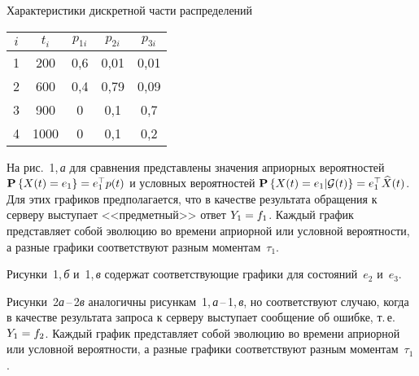 \begin{multicols}{2}
\vspace*{6pt}

\noindent
\begin{center}
{\small{Характеристики дискретной части распределений}}
\end{center}


\noindent
{\small\begin{center}
\tabcolsep=15.5pt
\begin{tabular}{|c|c|c|c|c|}
\hline
$i$ & $t_i$ & $p_{1i}$& $p_{2i}$ & $p_{3i}$ \\
\hline
1 &  200 & 0,6& 0,01& 0,01\\
2 &  600 & 0,4 & 0,79& 0,09\\
3 &  900 & 0\hphantom{,9} & 0,1\hphantom{9}& 0,7\hphantom{9}\\
4  & 1000\hphantom{9} & 0\hphantom{,9} & 0,1\hphantom{9}& 0,2\hphantom{9}\\
\hline
\end{tabular}
\vspace*{3pt}
\end{center}}


На рис.~1,\,\textit{а} для сравнения пред\-став\-лены значения априорных вероятностей
$\pp{X(t)\hm=e_1}\hm=e_1^{\top}p(t)$ и условных вероятностей
$\pp{X(t)\hm=e_1|\G(t)}\hm=e_1^{\top}\widehat{X}(t)$. Для этих графиков
предполагается, что в качестве результата обращения к серверу выступает
<<предметный>> ответ $Y_1\hm=f_1$. Каждый график представляет собой эволюцию
во времени априорной или условной вероятности, а разные графики соответствуют
разным моментам~$\tau_1$.

\addtocounter{table}{1}


Рисунки~1,\,\textit{б}  и~1,\,\textit{в}
содержат соответствующие графики для со\-сто\-яний~$e_2$ и~$e_3$.


Рисунки~2\textit{а}\,--\,2\textit{в}
аналогичны рисункам~1,\,\textit{а}\,--\,1,\,\textit{в},
но соответствуют случаю, когда
в качестве результата запроса к серверу выступает сообщение об ошибке, т.\,е.\
$Y_1\hm=f_2$. Каждый график представляет собой эволюцию во времени априорной
или условной вероятности, а разные графики соответствуют разным моментам~$\tau_1$.


\end{multicols}
